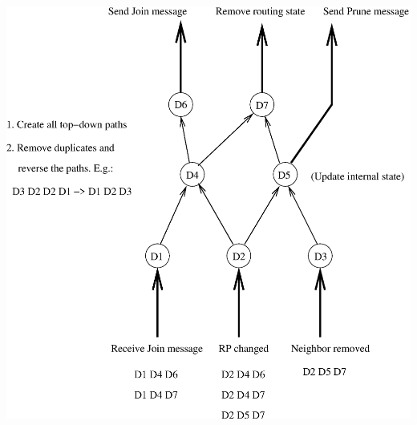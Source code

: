 \documentclass[landscape]{icsislides}
\begin{document}
\begin{slide}

\begin{center}
  \includegraphics[scale=0.6]{figs/pim_state_dependency3}
\end{center}

\end{slide}
\end{document}
